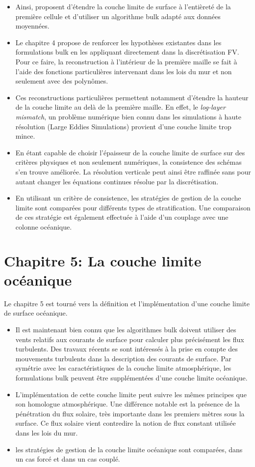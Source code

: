\begin{itemize}
\item Ainsi, \citep{nishizawa_surface_2018} proposent
	d'étendre la couche limite de surface à l'entièreté de
	la première cellule et d'utiliser un algorithme bulk
	adapté aux données moyennées.
\item Le chapitre 4 propose de renforcer les hypothèses
	existantes dans les formulations bulk en les
	appliquant directement dans la discrétisation FV.
	Pour ce faire, la reconstruction à l'intérieur
	de la première maille se fait à l'aide des fonctions
	particulières intervenant dans les lois du mur et
	non seulement avec des polynômes.
\item Ces reconstructions particulières permettent notamment
	d'étendre la hauteur de la couche limite au delà
	de la première maille.
	En effet, le \textit{log-layer mismatch},
	un problème numérique bien connu dans les
	simulations à haute résolution (Large Eddies
	Simulations)
	provient d'une couche limite trop mince.
\item En étant capable de choisir l'épaisseur de la couche
	limite de surface sur des critères physiques et non
	seulement numériques, la consistence des schémas
	s'en trouve améliorée. La résolution verticale
	peut ainsi être raffinée sans pour autant changer
	les équations continues résolue par la
			discrétisation.
\item En utilisant un critère de consistence, les stratégies
	de gestion de la couche limite sont
	comparées pour différents types de stratification.
	Une comparaison de ces stratégie est également effectuée
	à l'aide d'un couplage avec une colonne océanique.
\end{itemize}
\section*{Chapitre 5: La couche limite océanique}
Le chapitre 5 est tourné vers la définition et l'implémentation
d'une couche limite de surface océanique.
\begin{itemize}
	\item Il est maintenant bien connu que les algorithmes
		bulk doivent utiliser des vents relatifs aux
		courants de surface pour calculer plus précisément
		les flux turbulents.
		Des travaux récents \citep{pelletier_two-sided_2021}
		se sont intéressés à la prise en compte des mouvements
		turbulents dans la description des courants de
		surface. Par symétrie avec les caractéristiques
		de la couche limite atmosphérique, les formulations
		bulk peuvent être supplémentées d'une couche
		limite océanique.
	\item L'implémentation de cette couche limite peut suivre
		les mêmes principes que son homologue atmosphérique.
		Une différence notable est la présence de la
		pénétration du flux solaire, très importante dans
		les premiers mètres sous la surface.
		Ce flux solaire vient contredire la notion de flux
		constant utilisée dans les lois du mur.
	\item les stratégies de gestion de la couche limite
		océanique sont comparées, dans un cas forcé et
		dans un cas couplé.
\end{itemize}
